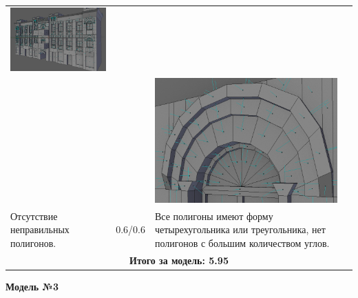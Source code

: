 \begin{longtable}{|p{4cm}|p{2.5cm}|p{7.5cm}|}
    \includegraphics[width=7cm]{src/norm_3}\\
    & & \includegraphics[width=7cm]{src/norm_4}\\
    \hline
    Отсутствие неправильных полигонов. & 0.6/0.6 & Все полигоны имеют форму четырехугольника или треугольника, нет полигонов с большим количеством углов. \\
    \hline
    \multicolumn{3}{|c|}{\textbf{Итого за модель: 5.95}}\\
    \hline
\end{longtable}

\begin{center}
    \textbf{Модель №3}
\end{center}

